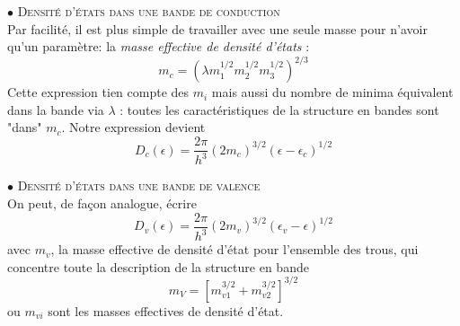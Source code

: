 $\bullet$ \textsc{Densité d'états dans une bande de conduction}\\
Par facilité, il est plus simple de travailler avec une seule masse pour n'avoir 
qu'un paramètre: la \textit{masse effective de densité d'états} :
\begin{equation}
m_c = \left(\lambda m_1^{1/2}m_2^{1/2}m_3^{1/2}\right)^{2/3}
\end{equation}
Cette expression tien compte des $m_i$ mais aussi du nombre de minima équivalent 
dans la bande via $\lambda$ : toutes les caractéristiques de la structure en bandes 
sont "dans" $m_c$. Notre expression devient
\begin{equation}
D_c(\epsilon) = \dfrac{2\pi}{h^3}(2m_c)^{3/2}(\epsilon-\epsilon_c)^{1/2}
\end{equation}


$\bullet$ \textsc{Densité d'états dans une bande de valence}\\
On peut, de façon analogue, écrire
\begin{equation}
D_v(\epsilon) = \dfrac{2\pi}{h^3}(2m_v)^{3/2}(\epsilon_v-\epsilon)^{1/2}
\end{equation}
avec $m_v$, la masse effective de densité d'état pour l'ensemble des trous,  
qui concentre toute la description de la structure en bande 
\begin{equation}
m_V = \left[m_{v1}^{3/2}+m_{v2}^{3/2}\right]^{3/2}
\end{equation}
ou $m_{vi}$ sont les masses effectives de densité d'état.